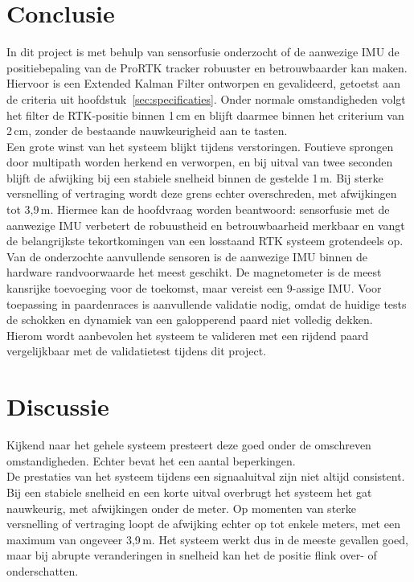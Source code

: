 \section{Conclusie}
\label{sec:conclusie}

In dit project is met behulp van sensorfusie onderzocht of de aanwezige IMU de 
positiebepaling van de ProRTK tracker robuuster en betrouwbaarder kan maken. Hiervoor is een Extended Kalman Filter ontworpen en gevalideerd, getoetst aan de criteria uit hoofdstuk~\ref{sec:specificaties}. Onder normale omstandigheden volgt het filter de RTK-positie binnen 1\,cm en blijft daarmee binnen het criterium van 2\,cm, zonder de bestaande nauwkeurigheid aan te tasten. \\

Een grote winst van het systeem blijkt tijdens verstoringen. Foutieve sprongen door multipath worden herkend en verworpen, en bij uitval van twee seconden blijft de afwijking bij een stabiele snelheid binnen de gestelde 1\,m. Bij sterke versnelling of vertraging wordt deze grens echter overschreden, met afwijkingen tot 3,9\,m. Hiermee kan de hoofdvraag worden beantwoord: sensorfusie met de aanwezige IMU verbetert de robuustheid en betrouwbaarheid merkbaar en vangt de belangrijkste tekortkomingen van een losstaand RTK systeem grotendeels op. \\

Van de onderzochte aanvullende sensoren is de aanwezige IMU binnen de hardware randvoorwaarde het meest geschikt. De magnetometer is de meest kansrijke toevoeging voor de toekomst, maar vereist een 9-assige IMU. Voor toepassing in paardenraces is aanvullende validatie nodig, omdat de huidige tests de schokken en dynamiek van een galopperend paard niet volledig dekken. Hierom wordt aanbevolen het systeem te valideren met een rijdend paard vergelijkbaar met de validatietest tijdens dit project.

\newpage

\section{Discussie}
\label{sec:discussie}

Kijkend naar het gehele systeem presteert deze goed onder de omschreven omstandigheden. Echter bevat het een aantal beperkingen. \\

De prestaties van het systeem tijdens een signaaluitval zijn niet altijd consistent. Bij een stabiele snelheid en een korte uitval overbrugt het systeem het gat nauwkeurig, met afwijkingen onder de meter. Op momenten van sterke versnelling of vertraging loopt de afwijking echter op tot enkele meters, met een maximum van ongeveer 3,9\,m. Het systeem werkt dus in de meeste gevallen goed, maar bij abrupte veranderingen in snelheid kan het de positie flink over- of onderschatten. \\

